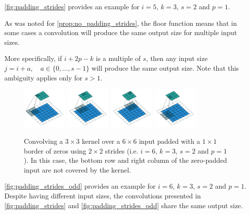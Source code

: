 \documentclass{article}
\begin{document}
\autoref{fig:padding_strides} provides an example for $i = 5$, $k = 3$, $s = 2$
and $p = 1$.

As was noted for \autoref{prop:no_padding_strides}, the floor function means
that in some cases a convolution will produce the same output size for multiple
input sizes.

More specifically, if $i + 2p - k$ is a multiple of $s$, then any input size $j
= i + a, \quad a \in \{0,\ldots,s - 1\}$ will produce the same output size. Note
that this ambiguity applies only for $s > 1$.

\begin{figure}[h]
    \centering
    \includegraphics[width=0.2\textwidth]{pdf/padding_strides_odd_00.pdf}
    \includegraphics[width=0.2\textwidth]{pdf/padding_strides_odd_01.pdf}
    \includegraphics[width=0.2\textwidth]{pdf/padding_strides_odd_02.pdf}
    \includegraphics[width=0.2\textwidth]{pdf/padding_strides_odd_03.pdf}
    \caption{\label{fig:padding_strides_odd} Convolving a $3 \times 3$ kernel
        over a $6 \times 6$ input padded with a $1 \times 1$ border of zeros
        using $2 \times 2$ strides (i.e.  $i = 6$, $k = 3$, $s = 2$ and
        $p = 1$). In this case, the bottom row and right column of the
        zero-padded input are not covered by the kernel.}
\end{figure}

\autoref{fig:padding_strides_odd} provides an example for $i = 6$, $k = 3$, $s =
2$ and $p = 1$. Despite having different input sizes, the convolutions presented
in \autoref{fig:padding_strides} and \autoref{fig:padding_strides_odd} share the
same output size.
\end{document}
